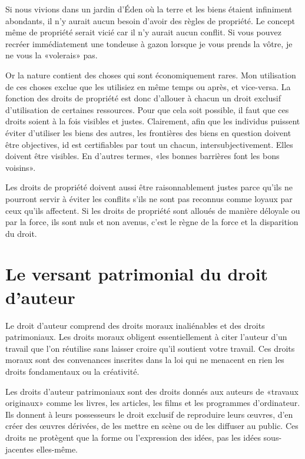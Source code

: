 Si nous vivions dans un jardin d'Éden où la terre et les biens étaient infiniment abondants, il n'y aurait aucun besoin d'avoir des règles de propriété. Le concept même de propriété serait vicié car il n'y aurait aucun conflit. Si vous pouvez recréer immédiatement une tondeuse à gazon lorsque je vous prends la vôtre, je ne vous la «volerais» pas. 

Or la nature contient des choses qui sont économiquement rares. Mon utilisation de ces choses exclue que les utilisiez en même temps ou après, et vice-versa. La fonction des droits de propriété est donc d'allouer à chacun un droit exclusif d'utilisation de certaines ressources. Pour que cela soit possible, il faut que ces droits soient à la fois visibles et justes. Clairement, afin que les individus puissent éviter d'utiliser les biens des autres, les frontières des biens en question doivent être objectives, id est certifiables par tout un chacun, intersubjectivement. Elles doivent être visibles. En d'autres termes, «les bonnes barrières font les bons voisins». 

Les droits de propriété doivent aussi être raisonnablement justes parce qu'ils ne pourront servir à éviter les conflits s'ils ne sont pas reconnus comme loyaux par ceux qu'ils affectent. Si les droits de propriété sont alloués de manière déloyale ou par la force, ils sont nuls et non avenus, c'est le règne de la force et la disparition du droit. 

\section{Le versant patrimonial du droit d'auteur}

Le droit d'auteur comprend des droits moraux inaliénables et des droits patrimoniaux. Les droits moraux obligent essentiellement à citer l'auteur d'un travail que l'on réutilise sans laisser croire qu'il soutient votre travail. Ces droits moraux sont des convenances inscrites dans la loi qui ne menacent en rien les droits fondamentaux ou la créativité.

Les droits d'auteur patrimoniaux sont des droits donnés aux auteurs de «travaux originaux» comme les livres, les articles, les films et les programmes d'ordinateur. Ils donnent à leurs possesseurs le droit exclusif de reproduire leurs œuvres, d'en créer des œuvres dérivées, de les mettre en scène ou de les diffuser au public. Ces droits ne protègent que la forme ou l'expression des idées, pas les idées sous-jacentes elles-même.

